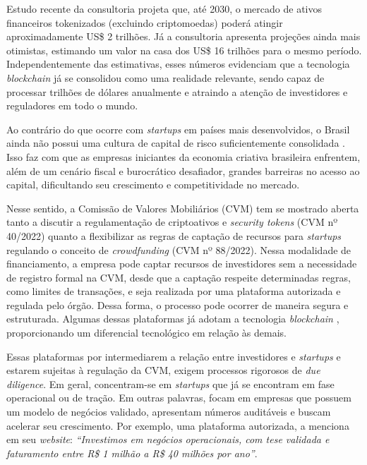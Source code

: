 \documentclass[12pt, a4paper, oneside, openright, chapter=TITLE]{abntex2}
\begin{document}
Estudo recente da consultoria  projeta que, até 2030, o mercado de ativos financeiros tokenizados (excluindo criptomoedas) poderá atingir aproximadamente US\$ 2 trilhões. Já a consultoria  apresenta projeções ainda mais otimistas, estimando um valor na casa dos US\$ 16 trilhões para o mesmo período. Independentemente das estimativas, esses números evidenciam que a tecnologia \textit{blockchain} já se consolidou como uma realidade relevante, sendo capaz de processar trilhões de dólares anualmente e atraindo a atenção de investidores e reguladores em todo o mundo.

Ao contrário do que ocorre com \textit{startups} em países mais desenvolvidos, o Brasil ainda não possui uma cultura de capital de risco suficientemente consolidada \cite{xp2024outliers, azevedo2025}. Isso faz com que as empresas iniciantes da economia criativa brasileira enfrentem, além de um cenário fiscal e burocrático desafiador, grandes barreiras no acesso ao capital, dificultando seu crescimento e competitividade no mercado.

Nesse sentido, a Comissão de Valores Mobiliários (CVM) tem se mostrado aberta tanto a discutir a regulamentação de criptoativos e \textit{security tokens} (CVM nº 40/2022) quanto a flexibilizar as regras de captação de recursos para \textit{startups} regulando o conceito de \textit{crowdfunding} (CVM nº 88/2022). Nessa modalidade de financiamento, a empresa pode captar recursos de investidores sem a necessidade de registro formal na CVM, desde que a captação respeite determinadas regras, como limites de transações, e seja realizada por uma plataforma autorizada e regulada pelo órgão. Dessa forma, o processo pode ocorrer de maneira segura e estruturada. Algumas dessas plataformas já adotam a tecnologia \textit{blockchain} \cite{ruffoni2020}, proporcionando um diferencial tecnológico em relação às demais.

Essas plataformas por intermediarem a relação entre investidores e \textit{startups} e estarem sujeitas à regulação da CVM, exigem processos rigorosos de \textit{due diligence}. Em geral, concentram-se em \textit{startups} que já se encontram em fase operacional ou de tração. Em outras palavras, focam em empresas que possuem um modelo de negócios validado, apresentam números auditáveis e buscam acelerar seu crescimento. Por exemplo, uma plataforma autorizada, a  menciona em seu \textit{website}: \textit{“Investimos em negócios operacionais, com tese validada e faturamento entre R\$ 1 milhão a R\$ 40 milhões por ano”}.
\end{document}
